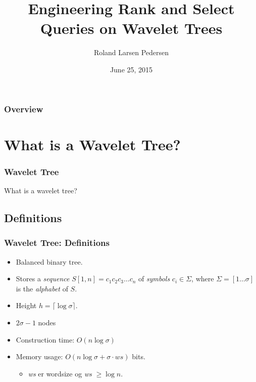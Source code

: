 \documentclass{beamer}
\title[Wavelet Tree]{Engineering Rank and Select Queries on Wavelet Trees} %
\author{Roland Larsen Pedersen} %
\institute[Datalogi] %
{
Datalogi, Aarhus Universitet \\ %
\medskip
\textit{Thesis defence}
}
\date{June 25, 2015} %
\begin{document}
\begin{frame}
\titlepage %
\end{frame}

\begin{frame}
\frametitle{Overview} %
\tableofcontents %
\end{frame}



\section{What is a Wavelet Tree?}

\begin{frame}
\frametitle{Wavelet Tree}
\begin{center} \Huge{What is a wavelet tree?} \end{center}
\end{frame}

\subsection{Definitions}
\begin{frame}
\frametitle{Wavelet Tree: Definitions}
\begin{itemize}
\setlength\itemsep{1em}
\item Balanced binary tree. 
\item Stores a \textit{sequence} $S[1,n] = c_1c_2c_3 \ldots c_n$ of \textit{symbols} $c_i \in \Sigma$, where $\Sigma = [1 \ldots \sigma]$ is the \textit{alphabet} of $S$.
\item Height $h = \lceil \log \sigma \rceil$.
\item $2 \sigma - 1$ nodes
\item Construction time: $O(n \log \sigma)$
\item Memory usage: $O(n \log \sigma + \sigma \cdot \mathit{ws})$ bits. 
\begin{itemize}
\item \textit{ws} er wordsize og \textit{ws} $ \geq \log n $.
\end{itemize}

\end{itemize}

\end{frame}
\end{document}
